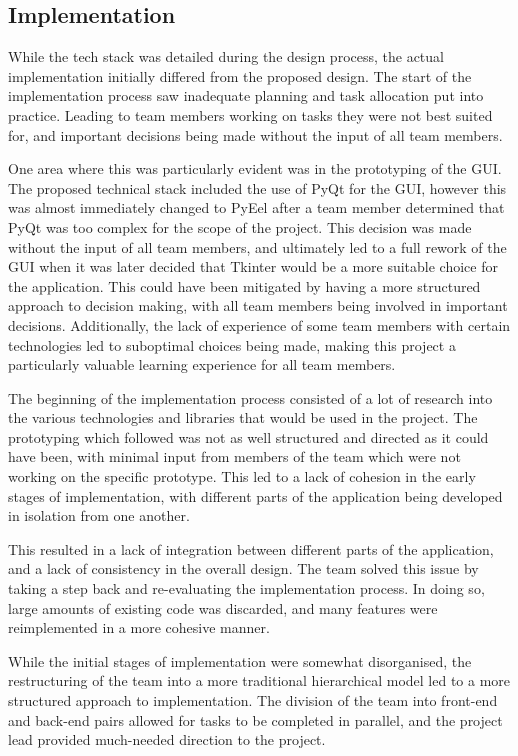 \documentclass[conference]{IEEEtran}
\begin{document}
\subsection{Implementation}
While the tech stack was detailed during the design process, the actual implementation initially differed from the proposed design. The start of the implementation process saw inadequate planning and task allocation put into practice. Leading to team members working on tasks they were not best suited for, and important decisions being made without the input of all team members.

One area where this was particularly evident was in the prototyping of the GUI. The proposed technical stack included the use of PyQt for the GUI, however this was almost immediately changed to PyEel after a team member determined that PyQt was too complex for the scope of the project. This decision was made without the input of all team members, and ultimately led to a full rework of the GUI when it was later decided that Tkinter would be a more suitable choice for the application. This could have been mitigated by having a more structured approach to decision making, with all team members being involved in important decisions. Additionally, the lack of experience of some team members with certain technologies led to suboptimal choices being made, making this project a particularly valuable learning experience for all team members.

The beginning of the implementation process consisted of a lot of research into the various technologies and libraries that would be used in the project. The prototyping which followed was not as well structured and directed as it could have been, with minimal input from members of the team which were not working on the specific prototype. This led to a lack of cohesion in the early stages of implementation, with different parts of the application being developed in isolation from one another.

This resulted in a lack of integration between different parts of the application, and a lack of consistency in the overall design. The team solved this issue by taking a step back and re-evaluating the implementation process. In doing so, large amounts of existing code was discarded, and many features were reimplemented in a more cohesive manner. 

While the initial stages of implementation were somewhat disorganised, the restructuring of the team into a more traditional hierarchical model led to a more structured approach to implementation. The division of the team into front-end and back-end pairs allowed for tasks to be completed in parallel, and the project lead provided much-needed direction to the project.
\end{document}
